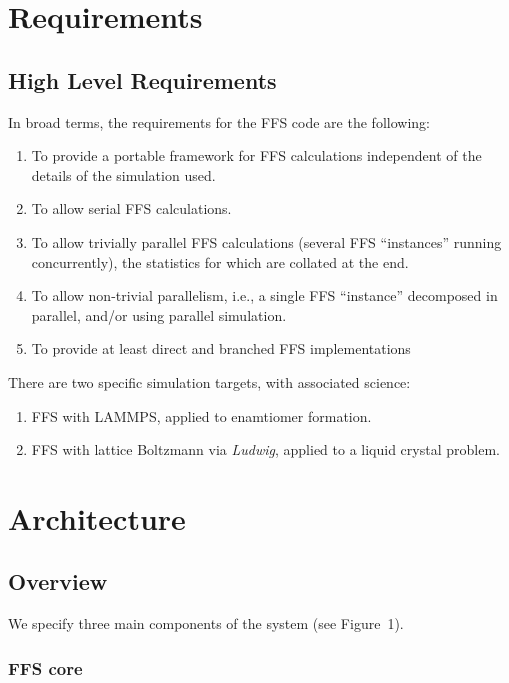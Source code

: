 \documentclass[11pt]{article}
\begin{document}

\section{Requirements}

\subsection{High Level Requirements}

In broad terms, the requirements for the FFS code are the following:
\begin{enumerate}
\item To provide a portable framework for FFS calculations
independent of the details of the simulation used.
\item To allow serial FFS calculations.
\item To allow trivially parallel FFS calculations (several FFS
``instances'' running concurrently), the statistics for which are
collated at the end.
\item To allow non-trivial parallelism, i.e., a single FFS ``instance''
decomposed in parallel, and/or using parallel simulation.
\item To provide at least direct and branched FFS implementations
\end{enumerate}

There are two specific simulation targets, with associated science:
\begin{enumerate}
\item FFS with LAMMPS, applied to enamtiomer formation.
\item FFS with lattice Boltzmann via \textit{Ludwig}, applied to
a liquid crystal problem.
\end{enumerate}


\section{Architecture}

\subsection{Overview}

We specify three main components of the system (see Figure~1).

\begin{figure}[h]
\end{figure}

\subsubsection{FFS core}
\end{document}
